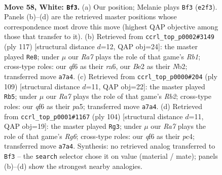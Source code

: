 \documentclass[11pt]{article}
\begin{document}
\clearpage

\begin{figure}[p]\centering
\begin{subfigure}{0.46\textwidth}\centering
\resizebox{\linewidth}{!}{%
\newchessgame
\chessboard[
  setfen={8/R7/5q2/2k5/1p6/b5K1/4B3/8 w - - 6 58},
  showmover=false,
  pgfstyle=straightmove, color=movearrow, markmove={e2-f3}
]}
\caption{}
\end{subfigure}\hfill
\begin{subfigure}{0.46\textwidth}\centering
\resizebox{\linewidth}{!}{%
\newchessgame
\chessboard[
  setfen={1r6/3k4/R7/8/1B6/2P2K2/1n6/8 b - - 2 59},
  showmover=false,
  pgfstyle=straightmove, color=movearrow, markmove={b8-e8}
]}
\caption{}
\end{subfigure}
\\[4pt]
\begin{subfigure}{0.46\textwidth}\centering
\resizebox{\linewidth}{!}{%
\newchessgame
\chessboard[
  setfen={8/1r6/8/P3k3/8/1BK5/2P5/8 b - - 0 55},
  showmover=false,
  pgfstyle=straightmove, color=movearrow, markmove={b7-b5}
]}
\caption{}
\end{subfigure}\hfill
\begin{subfigure}{0.46\textwidth}\centering
\resizebox{\linewidth}{!}{%
\newchessgame
\chessboard[
  setfen={8/p7/1b4R1/8/2p5/8/k3K3/8 w - - 0 53},
  showmover=false,
  pgfstyle=straightmove, color=movearrow, markmove={g6-g3}
]}
\caption{}
\end{subfigure}
\caption{\textbf{Move 58, White: \texttt{Bf3}.} (a) Our position; Melanie plays \texttt{Bf3} (\texttt{e2f3}). Panels (b)--(d) are the retrieved master positions whose correspondence most drove this move (highest QAP objective among those that transfer to it). (b) Retrieved from \texttt{ccrl\_top\_p0002\#3149} (ply 117) [structural distance $d$=12, QAP obj=24]: the master played \texttt{Re8}; under $\mu$ our \emph{Ra7} plays the role of that game's \emph{Rb1}; cross-type roles: our \emph{q}f6 as their \emph{r}a6, our \emph{B}e2 as their \emph{N}b2; transferred move \texttt{a7a4}. (c) Retrieved from \texttt{ccrl\_top\_p0000\#204} (ply 109) [structural distance $d$=11, QAP obj=22]: the master played \texttt{Rb5}; under $\mu$ our \emph{Ra7} plays the role of that game's \emph{Rb2}; cross-type roles: our \emph{q}f6 as their \emph{p}a5; transferred move \texttt{a7a4}. (d) Retrieved from \texttt{ccrl\_top\_p0001\#1167} (ply 104) [structural distance $d$=11, QAP obj=19]: the master played \texttt{Rg3}; under $\mu$ our \emph{Ra7} plays the role of that game's \emph{Rg6}; cross-type roles: our \emph{q}f6 as their \emph{p}c4; transferred move \texttt{a7a4}. Synthesis: no retrieved analog transferred to \texttt{Bf3} -- the \texttt{search} selector chose it on value (material / mate); panels (b)--(d) show the strongest nearby analogies.}
\label{fig:thought-m114}
\end{figure}
\end{document}
